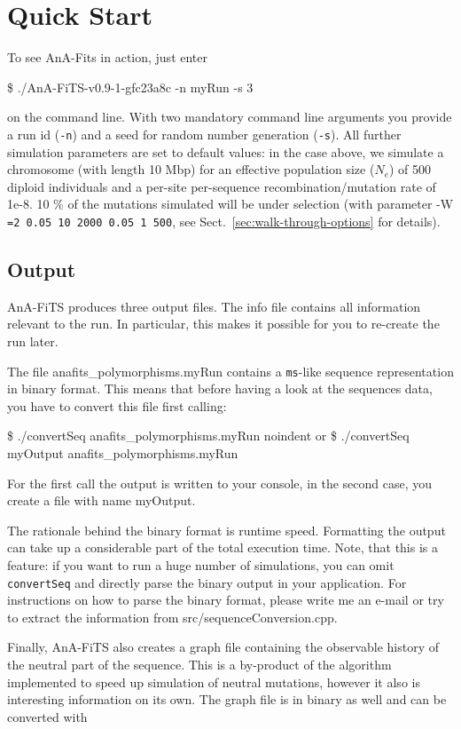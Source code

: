 \documentclass{scrartcl}
\begin{document}
\section{Quick Start}
\label{sec:quick-start}

\noindent To see AnA-Fits in action, just enter 

\$ ./AnA-FiTS-v0.9-1-gfc23a8c  -n myRun -s 3 

\noindent on the command line. With two mandatory command line
arguments you provide a run id (\texttt{-n}) and a seed for random
number generation (\texttt{-s}). All further simulation parameters are
set to default values: in the case above, we simulate a chromosome
(with length 10 Mbp) for an effective population size ($N_{e}$) of 500
diploid individuals and a per-site per-sequence recombination/mutation
rate of 1e-8. 10 \% of the mutations simulated will be under selection
(with parameter -W \texttt{=2 0.05 10 2000 0.05 1 500}, see
Sect.~\ref{sec:walk-through-options} for details).

\subsection{Output}
\label{sec:output}

AnA-FiTS produces three output files. The info file contains all
information relevant to the run. In particular, this makes it possible
for you to re-create the run later. 

The file anafits\_polymorphisms.myRun contains a \texttt{ms}-like
sequence representation in binary format. This means that before
having a look at the sequences data, you have to convert this file
first  calling: 

\$  ./convertSeq anafits\_polymorphisms.myRun
noindent or 
\$  ./convertSeq myOutput anafits\_polymorphisms.myRun

For the first call the output is written to your console, in the
second case, you create a file with name myOutput. 

The rationale behind the binary format is runtime speed. Formatting
the output can take up a considerable part of the total execution
time. Note, that this is a feature: if you want to run a huge number
of simulations, you can omit \texttt{convertSeq} and directly parse
the binary output in your application. For instructions on how to
parse the binary format, please write  me an e-mail or try to extract
the information from src/sequenceConversion.cpp. 

Finally, AnA-FiTS also creates a graph file containing the observable
history of the neutral part of the sequence. This is a by-product of
the algorithm implemented to speed up simulation of neutral mutations,
however it also is interesting information on its own. The graph file
is in binary as well and can be converted with 
\end{document}
